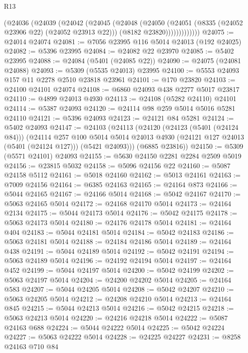 \begin{lexlean}{R13}
\begin{coremodule}
                (@24036
                  (@24039
                    (@24042
                      (@24045
                        (@24048
                          (@24050
                            (@24051 (@8335 (@24052 @23906 @22) (@24052 @23913 @22)))
                            (@8182 @23820)))))))))))))
@24075 := @24014 @24074
@24081 := @7056 @23995 @116 @5014 @24013 (@192 @24025)
@24082 := @5396 @23995
@24084 := @24082 @22 @23970
@24085 := @5402 @23995
@24088 := @24084 (@5401 (@24085 @22))
@24090 := @24075 (@24081 @24088)
@24093 := @5309 (@5535 @24013) @23995
@24100 := @5553 @24093 @157 @11 @2278 @2510 @23818 @23961
@24101 := @170 @23820
@24103 := @24100 @24101 @24074
@24108 := @6860 @24093 @438 @2277 @5017 @23817
@24110 := @4899 @24013 @4930
@24113 := @24108 (@5282 @24110) @24101
@24114 := @5387 @24093
@24120 := @24114 @98 @259 @5014 @5016 @5281 @24110
@24121 := @5396 @24093
@24123 := @24121 @84 @5281
@24124 := @5402 @24093
@24147 := @24103
    (@24113
      (@24120
        (@24123 (@5401 (@24124 @84)))
        (@24114
          @257
          @100
          @5014
          @5014
          @24013
          @4930
          (@24121 @127 @24013 (@5401 (@24124 @127)))
          (@5421 @24093)))
      (@6885 @23816))
@24150 := @5309 (@5571 @24101) @24093
@24155 := @5630 @24150 @2281 @2284 @2509 @5019
@24156 := @23815 @5032
@24158 := @5096 @24156 @22
@24160 := @5087 @24158 @5112
@24161 := @5018 @24160
@24162 := @5013 @24161
@24163 := @7009 @24156
@24164 := @6385 @24163
@24165 := @24164 @873
@24166 := @5044 @24165
@24167 := @24166 @5014
@24168 := @5042 @24167
@24170 := @5063 @24165 @5014
@24172 := @24168 @24170 @5014
@24173 := @24164 @2134
@24175 := @5044 @24173 @5014
@24176 := @5042 @24175
@24178 := @5063 @24173 @5014
@24180 := @24176 @24178 @5014
@24181 := @24164 @404
@24183 := @5044 @24181 @5014
@24184 := @5042 @24183
@24186 := @5063 @24181 @5014
@24188 := @24184 @24186 @5014
@24189 := @24164 @438
@24191 := @5044 @24189 @5014
@24192 := @5042 @24191
@24194 := @5063 @24189 @5014
@24196 := @24192 @24194 @5014
@24197 := @24164 @452
@24199 := @5044 @24197 @5014
@24200 := @5042 @24199
@24202 := @5063 @24197 @5014
@24204 := @24200 @24202 @5014
@24205 := @24164 @583
@24207 := @5044 @24205 @5014
@24208 := @5042 @24207
@24210 := @5063 @24205 @5014
@24212 := @24208 @24210 @5014
@24213 := @24164 @845
@24215 := @5044 @24213 @5014
@24216 := @5042 @24215
@24218 := @5063 @24213 @5014
@24220 := @24216 @24218 @5014
@24222 := @5087 @24163 @688
@24224 := @5044 @24222 @5014
@24225 := @5042 @24224
@24227 := @5063 @24222 @5014
@24228 := @24225 @24227
@24231 := @8258 @24163 @710 @84

\end{coremodule}
\end{lexlean}
